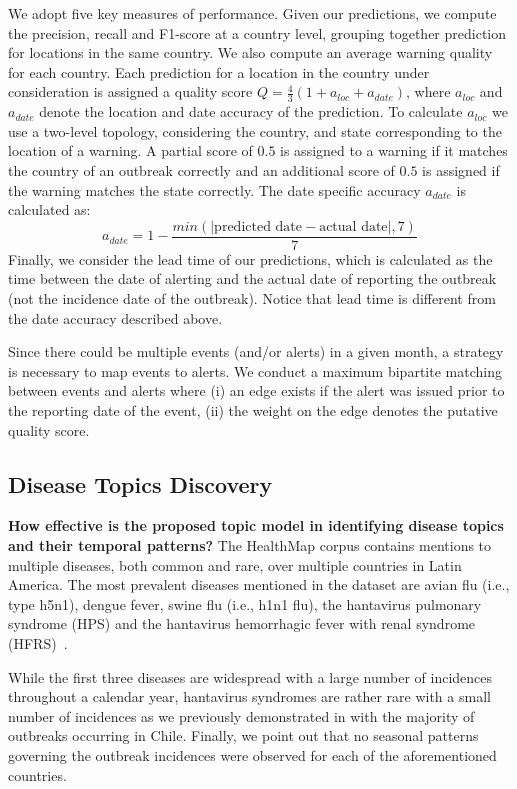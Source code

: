 \documentclass[conference]{IEEEtran}
\begin{document}
 We adopt five key measures of performance. Given our predictions, we compute the precision, recall and F1-score at a country level, grouping together prediction for locations in the same country. We also compute an average warning quality for each country. Each prediction for a location in the country under consideration is assigned a quality score $Q = \frac{4}{3}(1 + a_{loc} + a_{date})$, where $a_{loc}$ and $a_{date}$ denote the location and date accuracy of the prediction. To calculate $a_{loc}$ we use a two-level topology, considering the country, and state corresponding to the location of a warning. A partial score of $0.5$ is assigned to a warning if it matches the country of an outbreak correctly and an additional score of $0.5$ is assigned if the warning matches the state correctly. The date specific accuracy $a_{date}$ is calculated as: 
\begin{equation} 
a_{date} = 1 - \frac{min(|\mbox{predicted date} - \mbox{actual date}|,7)}{7}
\end{equation} 
Finally, we consider the lead time of our predictions, which is calculated as the time between the date of alerting and the actual date of reporting the outbreak (not the incidence date of the outbreak). Notice that lead time is different from the date accuracy described above.  

 Since there could be multiple events (and/or alerts) in a given month, a strategy is necessary to map events to alerts. We conduct a maximum bipartite matching between events and alerts where (i) an edge exists if the alert was issued prior to the reporting date of the event, (ii) the weight on the edge denotes the putative quality score. 

\subsection{Disease Topics Discovery}
\noindent\textbf{How effective is the proposed topic model in identifying disease topics and their temporal patterns?} The HealthMap corpus contains mentions to multiple diseases, both common and rare, over multiple countries in Latin America. The most prevalent diseases mentioned in the dataset are avian flu (i.e., type h5n1), dengue fever, swine flu (i.e., h1n1 flu), the hantavirus pulmonary syndrome (HPS) and the hantavirus hemorrhagic fever with renal syndrome (HFRS)~\cite{jonsson:10}. 

While the first three diseases are widespread with a large number of incidences throughout a calendar year, hantavirus syndromes are rather rare with a small number of incidences as we previously demonstrated in  with the majority of outbreaks occurring in Chile. Finally, we point out that no seasonal patterns governing the outbreak incidences were observed for each of the aforementioned countries.
\end{document}
